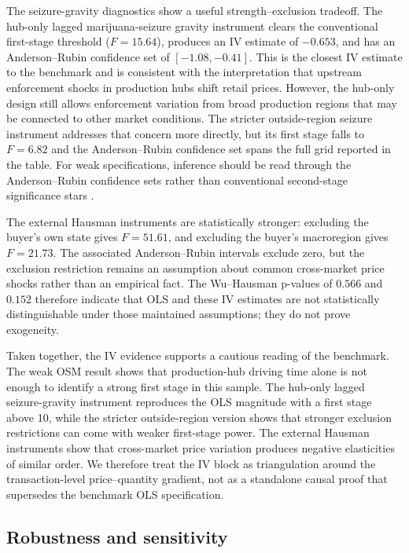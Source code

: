 The seizure-gravity diagnostics show a useful strength--exclusion tradeoff.  The hub-only lagged marijuana-seizure gravity instrument clears the conventional first-stage threshold ($F=15.64$), produces an IV estimate of $-0.653$, and has an Anderson--Rubin confidence set of $[-1.08,-0.41]$.  This is the closest IV estimate to the benchmark and is consistent with the interpretation that upstream enforcement shocks in production hubs shift retail prices.  However, the hub-only design still allows enforcement variation from broad production regions that may be connected to other market conditions.  The stricter outside-region seizure instrument addresses that concern more directly, but its first stage falls to $F=6.82$ and the Anderson--Rubin confidence set spans the full grid reported in the table.  For weak specifications, inference should be read through the Anderson--Rubin confidence sets rather than conventional second-stage significance stars \citep{anderson1949estimation}.

The external Hausman instruments are statistically stronger: excluding the buyer's own state gives $F=51.61$, and excluding the buyer's macroregion gives $F=21.73$.  The associated Anderson--Rubin intervals exclude zero, but the exclusion restriction remains an assumption about common cross-market price shocks rather than an empirical fact.  The Wu--Hausman p-values of $0.566$ and $0.152$ therefore indicate that OLS and these IV estimates are not statistically distinguishable under those maintained assumptions; they do not prove exogeneity.



Taken together, the IV evidence supports a cautious reading of the benchmark.  The weak OSM result shows that production-hub driving time alone is not enough to identify a strong first stage in this sample.  The hub-only lagged seizure-gravity instrument reproduces the OLS magnitude with a first stage above 10, while the stricter outside-region version shows that stronger exclusion restrictions can come with weaker first-stage power.  The external Hausman instruments show that cross-market price variation produces negative elasticities of similar order.  We therefore treat the IV block as triangulation around the transaction-level price--quantity gradient, not as a standalone causal proof that supersedes the benchmark OLS specification.

\subsection{Robustness and sensitivity}

